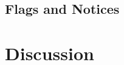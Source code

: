 \documentclass[11pt,a4paper]{article}
\begin{document}
\subsection{Flags and Notices}
\section{Discussion}


\newpage 

{}

\end{document}
